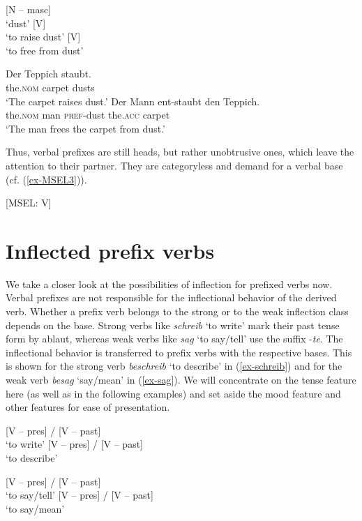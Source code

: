\documentclass[output=paper
  ,nobabel
  ,draftmode
  ,colorlinks, citecolor=brown
]{langscibook}
\begin{document}
\eal\label{ex-staub}
\ex{} [N – masc]\\`dust'
\ex{} [V]\\`to raise dust'
\ex{} [V]\\`to free from dust'
\zl

\eal\label{ex-staub2}
\ex
\gll Der Teppich staubt. \\
     the.\textsc{nom} carpet dusts \\
\glt `The carpet raises dust.'
\ex
\gll Der             Mann   ent-staubt   den          Teppich. \\
     the.\textsc{nom}   man      \textsc{pref}-dust    the.\textsc{acc}   carpet \\
\glt `The man frees the carpet from dust.'
\zl

\noindent Thus, verbal prefixes are still heads, but rather unobtrusive ones, which leave the attention to their partner. They are categoryless and demand for a verbal base (cf. (\ref{ex-MSEL3})).

\ea\label{ex-MSEL3}
 [MSEL: V]
\z

\section{Inflected prefix verbs}\label{sec-inflpre}

We take a closer look at the possibilities of inflection for prefixed verbs now. Verbal prefixes are not responsible for the inflectional behavior of the derived verb. Whether a prefix verb belongs to the strong or to the weak inflection class depends on the base. Strong verbs like \emph{schreib} `to write' mark their past tense form by ablaut, whereas weak verbs like \emph{sag} `to say/tell' use the suffix   -\emph{te}. The inflectional behavior is transferred to prefix verbs with the respective bases. This is shown for the strong verb \emph{beschreib} `to describe' in (\ref{ex-schreib}) and for the weak verb \emph{besag} `say/mean' in (\ref{ex-sag}). We will concentrate on the tense feature here (as well as in the following examples) and set aside the mood feature and other features for ease of presentation.

\eal\label{ex-schreib}
\ex{}  {}[V – pres{}] /  {}[V – past{}]\\`to write'
\ex{} {}[V – pres{}] /  {}[V – past{}]\\`to describe'
\zl

\eal\label{ex-sag}
\ex{} {}[V – pres{}] /  {}[V – past{}]\\`to say/tell'
\ex{} {}[V – pres{}] /  {}[V – past{}]\\`to say/mean'
\zl
\end{document}
